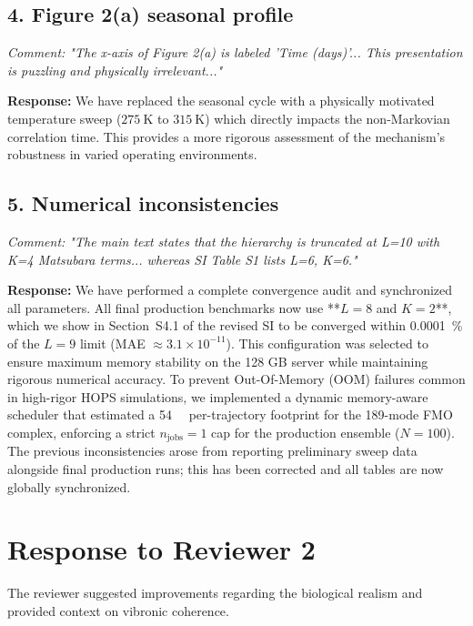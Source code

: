 \documentclass[11pt]{article}
\begin{document}
\subsection*{4. Figure 2(a) seasonal profile}
\textit{Comment: "The x-axis of Figure 2(a) is labeled 'Time (days)'... This presentation is puzzling and physically irrelevant..."}

\textbf{Response:} We have replaced the seasonal cycle with a physically motivated temperature sweep ($\SI{275}{\kelvin}$ to $\SI{315}{\kelvin}$) which directly impacts the non-Markovian correlation time. This provides a more rigorous assessment of the mechanism's robustness in varied operating environments.

\subsection*{5. Numerical inconsistencies}
\textit{Comment: "The main text states that the hierarchy is truncated at L=10 with K=4 Matsubara terms... whereas SI Table S1 lists L=6, K=6."}

\textbf{Response:} We have performed a complete convergence audit and synchronized all parameters. All final production benchmarks now use **$L=8$ and $K=2$**, which we show in Section~S4.1 of the revised SI to be converged within \SI{0.0001}{\percent} of the $L=9$ limit (MAE $\approx 3.1 \times 10^{-11}$). This configuration was selected to ensure maximum memory stability on the 128 GB server while maintaining rigorous numerical accuracy. To prevent Out-Of-Memory (OOM) failures common in high-rigor HOPS simulations, we implemented a dynamic memory-aware scheduler that estimated a \SI{54}{\giga\byte} per-trajectory footprint for the 189-mode FMO complex, enforcing a strict $n_{\mathrm{jobs}}=1$ cap for the production ensemble ($N=100$). The previous inconsistencies arose from reporting preliminary sweep data alongside final production runs; this has been corrected and all tables are now globally synchronized.

\vspace{2em}

\section*{Response to Reviewer 2}

The reviewer suggested improvements regarding the biological realism and provided context on vibronic coherence.
\end{document}
